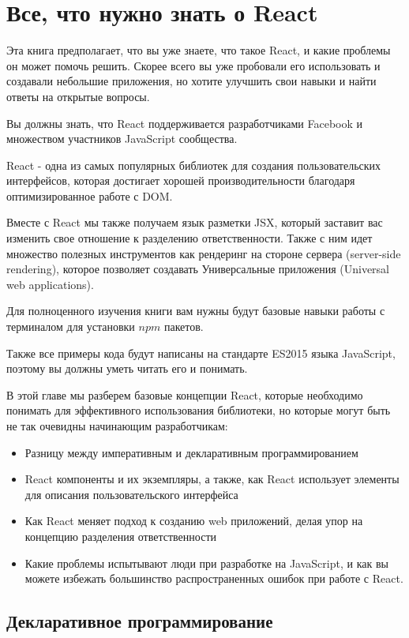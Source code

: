 \chapter{Все, что нужно знать о React}

Эта книга предполагает, что вы уже знаете, что такое React, и какие проблемы он может помочь решить. Скорее всего вы уже пробовали его использовать и создавали небольшие приложения, но хотите улучшить свои навыки и найти ответы на открытые вопросы.

Вы должны знать, что React поддерживается разработчиками Facebook и множеством участников JavaScript сообщества.

React - одна из самых популярных библиотек для создания пользовательских интерфейсов, которая достигает хорошей производительности благодаря оптимизированное работе с DOM.

Вместе с React мы также получаем язык разметки JSX, который заставит вас изменить свое отношение к разделению ответственности. Также с ним идет множество полезных инструментов как рендеринг на стороне сервера (server-side rendering), которое позволяет создавать Универсальные приложения (Universal web applications).

Для полноценного изучения книги вам нужны будут базовые навыки работы с терминалом для установки $npm$ пакетов.

Также все примеры кода будут написаны на стандарте ES2015 языка JavaScript, поэтому вы должны уметь читать его и понимать.

В этой главе мы разберем базовые концепции React, которые необходимо понимать для эффективного использования библиотеки, но которые могут быть не так очевидны начинающим разработчикам:

\begin{itemize}
  \item Разницу между императивным и декларативным программированием
  \item React компоненты и их экземпляры, а также, как React использует элементы для описания пользовательского интерфейса
  \item Как React меняет подход к созданию web приложений, делая упор на концепцию разделения ответственности
  \item Какие проблемы испытывают люди при разработке на JavaScript, и как вы можете избежать большинство распространенных ошибок при работе с React.
\end{itemize}


\section{Декларативное программирование}

